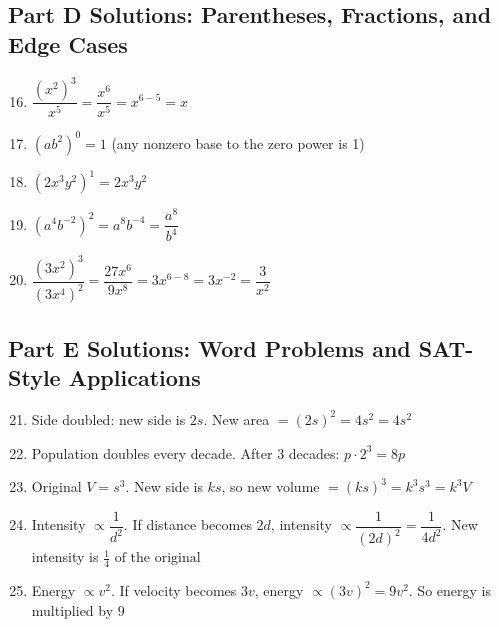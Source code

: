 \documentclass[14pt]{extarticle}
\begin{document}
\subsection*{Part D Solutions: Parentheses, Fractions, and Edge Cases}
\begin{enumerate}
  \setcounter{enumi}{15}
  \item \(\dfrac{(x^2)^3}{x^5} = \dfrac{x^6}{x^5} = x^{6-5} = \boxed{x}\)
  \item \((ab^2)^0 = \boxed{1}\) \quad (any nonzero base to the zero power is 1)
  \item \((2x^3 y^2)^1 = \boxed{2x^3 y^2}\)
  \item \((a^4 b^{-2})^2 = a^{8} b^{-4} = \boxed{\dfrac{a^8}{b^4}}\)
  \item \(\dfrac{(3x^2)^3}{(3x^4)^2} = \dfrac{27x^6}{9x^8} = 3x^{6-8} = 3x^{-2} = \boxed{\dfrac{3}{x^2}}\)
\end{enumerate}

\subsection*{Part E Solutions: Word Problems and SAT-Style Applications}
\begin{enumerate}
  \setcounter{enumi}{20}
  \item Side doubled: new side is \(2s\). New area \(=(2s)^2 = 4s^2 = \boxed{4s^2}\)
  \item Population doubles every decade. After 3 decades: \(p \cdot 2^3 = \boxed{8p}\)
  \item Original \(V = s^3\). New side is \(ks\), so new volume \(=(ks)^3 = k^3 s^3 = \boxed{k^3 V}\)
  \item Intensity \(\propto \dfrac{1}{d^2}\). If distance becomes \(2d\), intensity \(\propto \dfrac{1}{(2d)^2} = \dfrac{1}{4d^2}\). New intensity is \(\boxed{\tfrac{1}{4}\text{ of the original}}\)
  \item Energy \(\propto v^2\). If velocity becomes \(3v\), energy \(\propto (3v)^2 = 9v^2\). So energy is multiplied by \(\boxed{9}\)
\end{enumerate}






\end{document}
